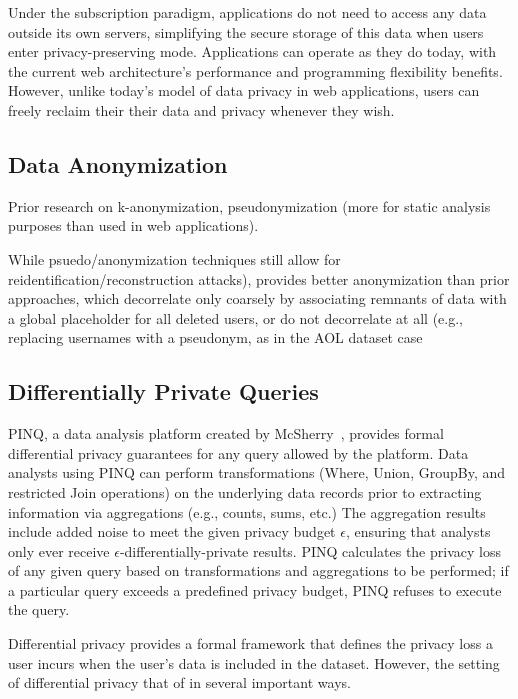 Under the subscription paradigm, applications do not need to access any data outside its own
servers, simplifying the secure storage of this data when users enter privacy-preserving mode.
Applications can operate as they do today, with the current web architecture's performance and
programming flexibility benefits. However, unlike today's model of data privacy in web applications,
users can freely reclaim their their data and privacy whenever they wish.

\subsection{Data Anonymization}

Prior research on k-anonymization, pseudonymization (more for static analysis purposes than used in
web applications).

While psuedo/anonymization
techniques still allow for reidentification/reconstruction attacks), \name provides better
anonymization than prior approaches, which decorrelate only coarsely by associating remnants of data
with a global placeholder for all deleted users, or do not decorrelate at all (e.g., replacing
usernames with a pseudonym, as in the AOL dataset case~%

\subsection{Differentially Private Queries}

PINQ, a data analysis platform created by McSherry~\cite{pinq}, provides formal differential privacy
guarantees for any query allowed by the platform.  Data analysts using PINQ can perform
transformations (Where, Union, GroupBy, and restricted Join operations) on the underlying data
records prior to extracting information via aggregations (e.g., counts, sums, etc.) The aggregation
results include added noise to meet the given privacy budget $\epsilon$, ensuring that analysts only
ever receive $\epsilon$-differentially-private results.  PINQ calculates the privacy loss of any
given query based on transformations and aggregations to be performed; if a particular query exceeds
a predefined privacy budget, PINQ refuses to execute the query.

Differential privacy provides a formal framework that defines the privacy loss a user incurs
when the user's data is included in the dataset. However, the setting of differential privacy
that of \name in several important ways. 

